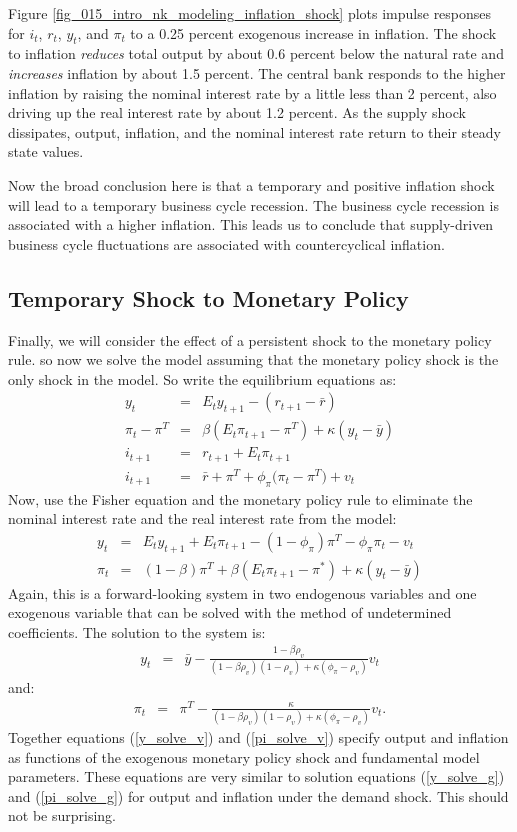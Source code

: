 \documentclass[12pt,fleqn]{article}
\newcommand{\EE}{\begin{eqnarray}}
\newcommand{\FF}{\end{eqnarray}}
\begin{document}


Figure \ref{fig_015_intro_nk_modeling_inflation_shock} plots impulse responses for $i_t$, $r_t$, $y_t$, and $\pi_t$ to a 0.25 percent exogenous increase in inflation.  The shock to inflation \emph{reduces} total output by about 0.6 percent below the natural rate and \emph{increases} inflation by about 1.5 percent. The central bank responds to the higher inflation by raising the nominal interest rate by a little less than 2 percent, also driving up the real interest rate by about 1.2 percent. As the supply shock dissipates, output, inflation, and the nominal interest rate return to their steady state values.

Now the broad conclusion here is that a temporary and positive inflation shock will lead to a temporary business cycle recession. The business cycle recession is associated with a higher inflation. This leads us to conclude that supply-driven business cycle fluctuations are associated with countercyclical inflation.


\subsection{Temporary Shock to Monetary Policy}

Finally, we will consider the effect of a persistent shock to the monetary policy rule. so now we solve the model assuming that the monetary policy shock is the only shock in the model. So write the equilibrium equations as:
	\EE
	y_t & = & E_t y_{t+1}  - \left( r_{t+1} - \bar{r}\right)\\
	\pi_t -\pi^T & = & \beta \left( E_t\pi_{t+1} - \pi^T\right)  + \kappa (y_t -\bar{y})\\
	i_{t+1} & = & r_{t+1} + E_t \pi_{t+1}\\
	i_{t+1} & = & \bar{r} + \pi^T + \phi_{\pi}\big(\pi_t - \pi^T\big) + v_t
	\FF
Now, use the Fisher equation and the monetary policy rule to eliminate the nominal interest rate and the real interest rate from the model:
	\EE
	y_t & = & E_t y_{t+1} + E_t\pi_{t+1}  - (1-\phi_{\pi})\pi^T - \phi_{\pi}\pi_t -  v_t\\
	\pi_t & = & (1-\beta) \pi^T + \beta \left( E_t\pi_{t+1} - \pi^*\right)  + \kappa (y_t -\bar{y})
	\FF
Again, this is a forward-looking system in two endogenous variables and one exogenous variable that can be solved with the method of undetermined coefficients. The solution to the system is:
	\EE
	y_t & = &\bar{y} - \frac{1-\beta\rho_v}{(1-\beta \rho_v)(1-\rho_v) + \kappa (\phi_{\pi} - \rho_v)}v_t \label{y_solve_v}
	\FF
and:
	\EE
	\pi_t & = & \pi^T - \frac{\kappa}{(1-\beta \rho_v)(1-\rho_v) + \kappa (\phi_{\pi} - \rho_v)} v_t.\label{pi_solve_v}
	\FF
Together equations (\ref{y_solve_v}) and (\ref{pi_solve_v}) specify output and inflation as functions of the exogenous monetary policy shock and fundamental model parameters. These equations are very similar to solution equations (\ref{y_solve_g}) and (\ref{pi_solve_g}) for output and inflation under the demand shock. This should not be surprising.
\end{document}
